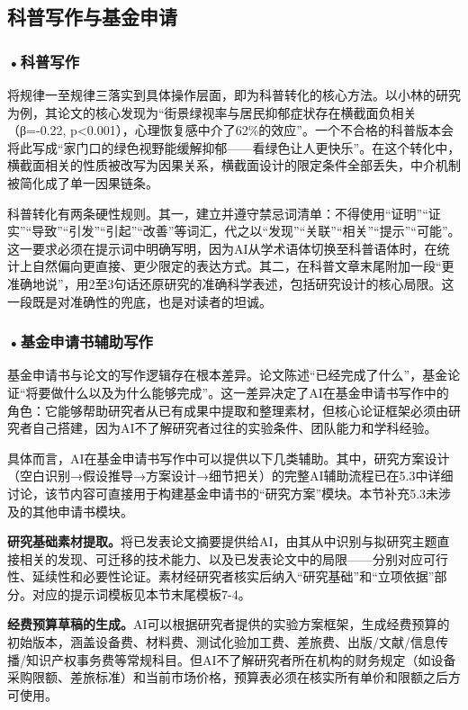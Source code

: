 \subsection{科普写作与基金申请}

\subsubsection*{\textbf{•科普写作}}

将规律一至规律三落实到具体操作层面，即为科普转化的核心方法。以小林的研究为例，其论文的核心发现为``街景绿视率与居民抑郁症状存在横截面负相关（β=-0.22, p<0.001），心理恢复感中介了62\%的效应''。一个不合格的科普版本会将此写成``家门口的绿色视野能缓解抑郁——看绿色让人更快乐''。在这个转化中，横截面相关的性质被改写为因果关系，横截面设计的限定条件全部丢失，中介机制被简化成了单一因果链条。

科普转化有两条硬性规则。其一，建立并遵守禁忌词清单：不得使用``证明''``证实''``导致''``引发''``引起''``改善''等词汇，代之以``发现''``关联''``相关''``提示''``可能''。这一要求必须在提示词中明确写明，因为AI从学术语体切换至科普语体时，在统计上自然偏向更直接、更少限定的表达方式。其二，在科普文章末尾附加一段``更准确地说''，用2至3句话还原研究的准确科学表述，包括研究设计的核心局限。这一段既是对准确性的兜底，也是对读者的坦诚。

\subsubsection*{\textbf{•基金申请书辅助写作}}

基金申请书与论文的写作逻辑存在根本差异。论文陈述``已经完成了什么''，基金论证``将要做什么以及为什么能够完成''。这一差异决定了AI在基金申请书写作中的角色：它能够帮助研究者从已有成果中提取和整理素材，但核心论证框架必须由研究者自己搭建，因为AI不了解研究者过往的实验条件、团队能力和学科经验。

具体而言，AI在基金申请书写作中可以提供以下几类辅助。其中，研究方案设计（空白识别→假设推导→方案设计→细节把关）的完整AI辅助流程已在5.3中详细讨论，该节内容可直接用于构建基金申请书的``研究方案''模块。本节补充5.3未涉及的其他申请书模块。

\textbf{研究基础素材提取。}将已发表论文摘要提供给AI，由其从中识别与拟研究主题直接相关的发现、可迁移的技术能力、以及已发表论文中的局限——分别对应可行性、延续性和必要性论证。素材经研究者核实后纳入``研究基础''和``立项依据''部分。对应的提示词模板见本节末尾模板7-4。

\textbf{经费预算草稿的生成。}AI可以根据研究者提供的实验方案框架，生成经费预算的初始版本，涵盖设备费、材料费、测试化验加工费、差旅费、出版/文献/信息传播/知识产权事务费等常规科目。但AI不了解研究者所在机构的财务规定（如设备采购限额、差旅标准）和当前市场价格，预算表必须在核实所有单价和限额之后方可使用。

